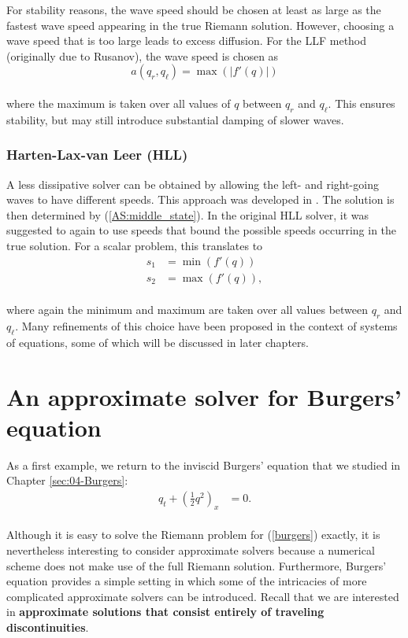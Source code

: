 \documentclass{SIAMbook2016}
\begin{document}
For stability reasons, the wave speed should be chosen at least as large
as the fastest wave speed appearing in the true Riemann solution.
However, choosing a wave speed that is too large leads to excess
diffusion. For the LLF method (originally due to Rusanov), the wave
speed is chosen as \[a(q_r, q_\ell) = \max(|f'(q)|)\]\\
where the maximum is taken over all values of \(q\) between \(q_r\) and
\(q_\ell\). This ensures stability, but may still introduce substantial
damping of slower waves.

\hypertarget{harten-lax-van-leer-hll}{%
\subsection{Harten-Lax-van Leer (HLL)}\label{harten-lax-van-leer-hll}}

A less dissipative solver can be obtained by allowing the left- and
right-going waves to have different speeds. This approach was developed
in \cite{HLL}. The solution is then determined by
(\ref{AS:middle_state}). In the original HLL solver, it was suggested to
again to use speeds that bound the possible speeds occurring in the true
solution. For a scalar problem, this translates to\\
\begin{align*}
s_1 & = \min(f'(q)) \\
s_2 & = \max(f'(q)),
\end{align*}\\
where again the minimum and maximum are taken over all values between
\(q_r\) and \(q_\ell\). Many refinements of this choice have been
proposed in the context of systems of equations, some of which will be
discussed in later chapters.

\hypertarget{an-approximate-solver-for-burgers-equation}{%
\chapter{An approximate solver for Burgers'
equation}\label{an-approximate-solver-for-burgers-equation}}
\label{sec:11-Burgers_approximate}
As a first example, we return to the inviscid Burgers' equation that we
studied in Chapter \ref{sec:04-Burgers}:\\
\begin{align} \label{burgers}
q_t + \left(\frac{1}{2}q^2\right)_x & = 0.
\end{align}\\
Although it is easy to solve the Riemann problem for (\ref{burgers})
exactly, it is nevertheless interesting to consider approximate solvers
because a numerical scheme does not make use of the full Riemann
solution. Furthermore, Burgers' equation provides a simple setting in
which some of the intricacies of more complicated approximate solvers
can be introduced. Recall that we are interested in \textbf{approximate
solutions that consist entirely of traveling discontinuities}.
\end{document}
